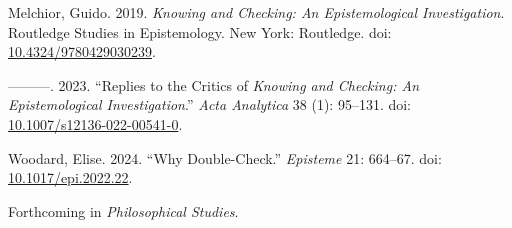 \documentclass[
  11pt,
  letterpaper,
  DIV=11,
  numbers=noendperiod,
  twoside]{scrartcl}
\newlength{\cslhangindent}
\newenvironment{CSLReferences}[2] %
 {\begin{list}{}{%
  \setlength{\itemindent}{0pt}
  \setlength{\leftmargin}{0pt}
  \setlength{\parsep}{0pt}
  \ifodd #1
   \setlength{\leftmargin}{\cslhangindent}
   \setlength{\itemindent}{-1\cslhangindent}
  \fi
  \setlength{\itemsep}{#2\baselineskip}}}
 {\end{list}}
\begin{document}
\begin{CSLReferences}{1}{0}
Melchior, Guido. 2019. \emph{Knowing and Checking: An Epistemological
Investigation}. Routledge Studies in Epistemology. New York: Routledge.
doi:
\href{https://doi.org/10.4324/9780429030239}{10.4324/9780429030239}.

---------. 2023. {``Replies to the Critics of \emph{Knowing and
Checking: An Epistemological Investigation}.''} \emph{Acta Analytica} 38
(1): 95--131. doi:
\href{https://doi.org/10.1007/s12136-022-00541-0}{10.1007/s12136-022-00541-0}.

Woodard, Elise. 2024. {``Why Double-Check.''} \emph{Episteme} 21:
664--67. doi:
\href{https://doi.org/10.1017/epi.2022.22}{10.1017/epi.2022.22}.

\end{CSLReferences}



\noindent Forthcoming in  \emph{Philosophical Studies}.
\end{document}
